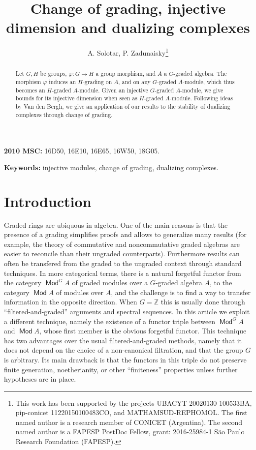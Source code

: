 \documentclass[11pt,fleqn]{article}
\title{
Change of grading, injective dimension and dualizing complexes
}
\author{A. Solotar,
P. Zadunaisky\footnote{This work has been supported by the projects 
UBACYT 20020130 100533BA, pip-conicet 11220150100483CO, and 
MATHAMSUD-REPHOMOL. The first named author is a research member of CONICET 
(Argentina). The second named author is a FAPESP PostDoc Fellow, grant: 
2016-25984-1 S\~ao Paulo Research Foundation (FAPESP).}
}
\date{}
\newcommand\ZZ{\mathbb Z}
\renewcommand\to{\longrightarrow}
\renewcommand\phi{\varphi}
\DeclareMathOperator\Mod{\mathsf{Mod}}
\begin{document}
\maketitle

\begin{abstract}
Let $G,H$ be groups, $\phi: G \to H$ a group morphism, and $A$ a $G$-graded 
algebra. The morphism $\phi$ induces an $H$-grading on $A$, and on any 
$G$-graded $A$-module, which thus becomes an $H$-graded $A$-module.
Given an injective $G$-graded $A$-module, we give bounds for its injective
dimension when seen as $H$-graded $A$-module. Following ideas by Van den
Bergh, we give an application of our results to the stability of dualizing
complexes through change of grading.
\end{abstract}

\textbf{2010 MSC:} 16D50, 16E10, 16E65, 16W50, 18G05.

\textbf{Keywords:} injective modules, change of grading, dualizing complexes.

\section{Introduction}
Graded rings are ubiquous in algebra. One of the main reasons is that the
presence of a grading simplifies proofs and allows to generalize many results
(for example, the theory of commutative and noncommutative graded algebras are 
easier to reconcile than their ungraded counterparts). Furthermore results can 
often be transfered from the graded to the ungraded context through standard 
techniques. In more categorical terms, there is a natural forgetful functor 
from the category $\Mod^G A$ of graded modules over a $G$-graded algebra 
$A$, to the category $\Mod A$ of modules over $A$, and the challenge is to 
find a way to transfer information in the opposite direction. When $G = \ZZ$ 
this is usually done through ``filtered-and-graded'' arguments and spectral 
sequences. In this article we exploit a different technique, 
namely the existence of a functor triple between $\Mod^G A$ and $\Mod A$, 
whose first member is the obvious forgetful functor. This technique has two 
advantages over the usual filtered-and-graded methods, namely that it does not 
depend on the choice of a non-canonical filtration, and that the group $G$ is
arbitrary. Its main drawback is that the functors in this triple do not 
preserve finite generation, noetherianity, or other ``finiteness'' properties
unless further hypotheses are in place.
\end{document}
